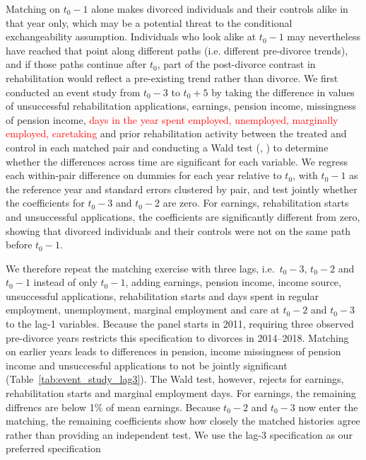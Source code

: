 \documentclass[a4paper,12pt]{article}
\theoremstyle{plain}
\theoremstyle{definition}
\theoremstyle{TheoremNum}
\theoremstyle{CorollaryNum}
\theoremstyle{PropositionNum}
\theoremstyle{TheoremNum}
\begin{document}
Matching on $t_0-1$ alone makes divorced individuals and their controls alike in that year only, which may be a potential threat to the conditional exchangeability assumption. Individuals who look alike at $t_0-1$ may nevertheless have reached that point along different paths (i.e. different pre-divorce trends), and if those paths continue after $t_0$, part of the post-divorce contrast in rehabilitation would reflect a pre-existing trend rather than divorce. We first conducted an event study from $t_0-3$ to $t_0+5$ by taking the difference in values of unsuccessful rehabilitation applications, earnings, pension income, missingness of pension income, \textcolor{red}{days in the year spent employed, unemployed, marginally employed, caretaking} and prior rehabilitation activity between the treated and control in each matched pair and conducting a Wald test (\citeauthor{wald1943tests}, \citeyear{wald1943tests}) to determine whether the differences across time are significant for each variable. We regress each within-pair difference on dummies for each year relative to $t_0$, with $t_0-1$ as the reference year and standard errors clustered by pair, and test jointly whether the coefficients for $t_0-3$ and $t_0-2$ are zero. For earnings, rehabilitation starts and unsuccessful applications, the coefficients are significantly different from zero, showing that divorced individuals and their controls were not on the same path before $t_0-1$. 


We therefore repeat the matching exercise with three lags, i.e.\ $t_0-3$, $t_0-2$ and $t_0-1$ instead of only $t_0-1$, adding earnings, pension income, income source, unsuccessful applications, rehabilitation starts and days spent in regular employment, unemployment, marginal employment and care at $t_0-2$ and $t_0-3$ to the lag-1 variables. Because the panel starts in 2011, requiring three observed pre-divorce years restricts this specification to divorces in 2014--2018. Matching on earlier years leads to differences in pension, income missingness of pension income and unsuccessful applications to not be jointly significant (Table~\ref{tab:event_study_lag3}). The Wald test, however, rejects for earnings, rehabilitation starts and marginal employment days. For earnings, the remaining diffrencs are below 1\% of mean earnings. Because $t_0-2$ and $t_0-3$ now enter the matching, the remaining coefficients show how closely the matched histories agree rather than providing an independent test. We use the lag-3 specification as our preferred specification 
\end{document}
